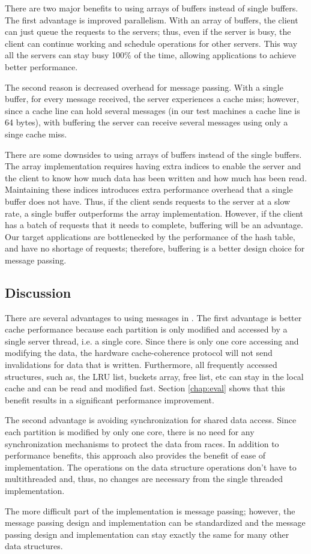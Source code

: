 There are two major benefits to using arrays of buffers instead of single
buffers. The first advantage is improved parallelism.  With an array of buffers,
the client can just queue the requests to the servers; thus, even if the server
is busy, the client can continue working and schedule operations for other
servers. This way all the servers can stay busy 100\% of the time, allowing
applications to achieve better performance.

The second reason is decreased overhead for message passing.  With a single
buffer, for every message received, the server experiences a cache miss;
however, since a cache line can hold several messages (in our test machines a
cache line is 64 bytes), with buffering the server can receive several messages
using only a singe cache miss.

There are some downsides to using arrays of buffers instead of the single
buffers.  The array implementation requires having extra indices to enable the
server and the client to know how much data has been written and how much has
been read. Maintaining these indices introduces extra performance overhead that
a single buffer does not have. Thus, if the client sends requests to the server
at a slow rate, a single buffer outperforms the array implementation. However,
if the client has a batch of requests that it needs to complete, buffering will
be an advantage. Our target applications are bottlenecked by the performance of
the hash table, and have no shortage of requests; therefore, buffering is a
better design choice for message passing.

\subsection{Discussion}
\label{sec:compmigration}

There are several advantages to using messages in \cphash{}. The first advantage
is better cache performance because each partition is only modified and accessed
by a single server thread, i.e. a single core.  Since there is only one core
accessing and modifying the data, the hardware cache-coherence protocol will not
send invalidations for data that is written. Furthermore, all frequently
accessed structures, such as, the LRU list, buckets array, free list, etc can
stay in the local cache and can be read and modified fast.  Section
\ref{chap:eval} shows that this benefit results in a significant performance
improvement.

The second advantage is avoiding synchronization for shared data access. Since
each partition is modified by only one core, there is no need for any
synchronization mechanisms to protect the data from races. In addition to
performance benefits, this approach also provides the benefit of ease of
implementation.  The operations on the data structure operations don't have to
multithreaded and, thus, no changes are necessary from the single threaded
implementation.

The more difficult part of the \cphash{} implementation is message passing;
however, the message passing design and implementation can be standardized and
the message passing design and implementation can stay exactly the same for many
other data structures.

